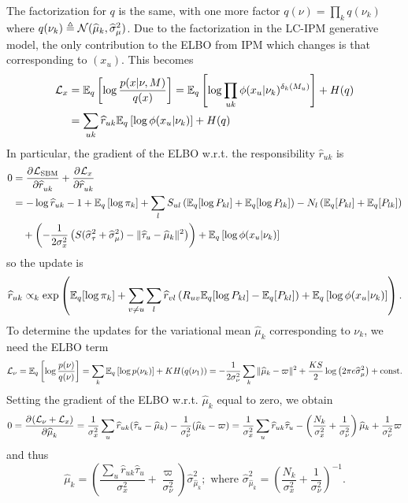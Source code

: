 \documentclass{article}
\begin{document}
The factorization for $q$ is the same, with one more factor $q(\nu) = \prod_kq(\nu_k)$ where $q(\nu_k)\triangleq \mathcal{N}(\widehat\mu_k,\widehat\sigma^2_\mu)$. Due to the factorization in the LC-IPM generative model, the only contribution to the ELBO from IPM which changes is that corresponding to $(x_u)$. This becomes%
\begin{align*}
\mathcal{L}_x 
&= \mathbb{E}_q\left[\log \frac{p(x|\nu, M)}{q(x)}\right]
= \mathbb{E}_q\left[\log \prod_{uk}\phi(x_u|\nu_k)^{\delta_k(M_u)}\right] + H(q) \\
&= \sum_{uk}\widehat r_{uk}\mathbb{E}_q\left[\log \phi(x_u|\nu_k)\right] + H(q) 
\end{align*}
In particular, the gradient of the ELBO w.r.t. the responsibility $\widehat r_{uk}$ is
\begin{align*}
0 
&= \frac{\partial^{}\mathcal{L}_\text{SBM}}{\partial \widehat r_{uk}^{}} + \frac{\partial^{}\mathcal{L}_x}{\partial \widehat r_{uk}^{}} \\
&= -\log \widehat r_{uk} - 1 + \mathbb{E}_q\left[\log \pi_k\right] + \sum_{l} S_{ul}\left(\mathbb{E}_q[\log P_{kl}] + \mathbb{E}_q[\log P_{lk}]\right) - N_l\left(\mathbb{E}_q[P_{kl}] + \mathbb{E}_q[P_{lk}]\right)\\
&~~~+ \left(-\frac{1}{2\sigma^2_x}\left(S(\widehat\sigma^2_\tau + \widehat\sigma^2_\mu) - \|\widehat\tau_u - \widehat\mu_k\|^2\right)\right) + \mathbb{E}_q\left[\log \phi(x_u|\nu_k)\right]
\end{align*}
so the update is
$$
\widehat r_{uk} \propto_k \exp\left(\mathbb{E}_q[\log \pi_k]
+ \sum_{v\neq u} \sum_l \widehat r_{vl}\left(R_{uv}\mathbb{E}_q[\log P_{kl}] - \mathbb{E}_q[P_{kl}]\right)
+ \mathbb{E}_q\left[\log \phi(x_u|\nu_k)\right]\right). 
$$
To determine the updates for the variational mean $\widehat \mu_k$ corresponding to $\nu_k$, we need the ELBO term
$$
\mathcal{L}_\nu 
= \mathbb{E}_q\left[\log \frac{p(\nu)}{q(\nu)}\right]
= \sum_k\mathbb{E}_q\left[\log p(\nu_k)\right] + KH(q(\nu_1))
= -\frac{1}{2\sigma_\nu^2}\sum_k\|\widehat\mu_k-\varpi\|^2 + \frac{KS}{2}\log\left(2\pi e\widehat\sigma^2_\mu\right) + \text{const.}
$$
Setting the gradient of the ELBO w.r.t. $\widehat\mu_k$ equal to zero, we obtain
$$
0
= \frac{\partial^{}(\mathcal{L}_\nu + \mathcal{L}_x)}{\partial \widehat\mu_k^{}}
= \frac{1}{\sigma_x^2}\sum_u\widehat r_{uk}(\widehat\tau_u -\widehat\mu_k)  - \frac{1}{\sigma_\nu^2}(\widehat \mu_k - \varpi)
= \frac{1}{\sigma_x^2}\sum_u\widehat r_{uk}\widehat\tau_u -\left(\frac{N_k}{\sigma_x^2}+\frac{1}{\sigma_\nu^2}\right)\widehat\mu_k + \frac{1}{\sigma_\nu^2}\varpi
$$
and thus
$$
\widehat\mu_k= \left(\frac{\sum_u\widehat r_{uk}\widehat\tau_u}{\sigma_x^2} + \frac{\varpi}{\sigma_\nu^2}\right)\widehat\sigma^2_{\hat\mu_k}; \text{ where }
\widehat\sigma^2_{\hat\mu_k} = \left(\frac{N_k}{\sigma_x^2}+\frac{1}{\sigma_\nu^2}\right)^{-1}.
$$
\end{document}
